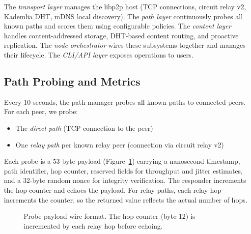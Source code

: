 \documentclass[sigconf,nonacm]{acmart}
\begin{document}
The \emph{transport layer} manages the libp2p host (TCP connections, circuit relay v2, Kademlia DHT, mDNS local discovery). The \emph{path layer} continuously probes all known paths and scores them using configurable policies. The \emph{content layer} handles content-addressed storage, DHT-based content routing, and proactive replication. The \emph{node orchestrator} wires these subsystems together and manages their lifecycle. The \emph{CLI/API layer} exposes operations to users.

\subsection{Path Probing and Metrics}

Every 10 seconds, the path manager probes all known paths to connected peers. For each peer, we probe:
\begin{itemize}
\item The \emph{direct path} (TCP connection to the peer)
\item One \emph{relay path} per known relay peer (connection via circuit relay v2)
\end{itemize}

Each probe is a 53-byte payload (Figure~\ref{fig:probe}) carrying a nanosecond timestamp, path identifier, hop counter, reserved fields for throughput and jitter estimates, and a 32-byte random nonce for integrity verification. The responder increments the hop counter and echoes the payload. For relay paths, each relay hop increments the counter, so the returned value reflects the actual number of hops.

\begin{figure}[t]
\centering
{}
\caption{Probe payload wire format. The hop counter (byte 12) is incremented by each relay hop before echoing.}
\label{fig:probe}
\end{figure}
\end{document}
